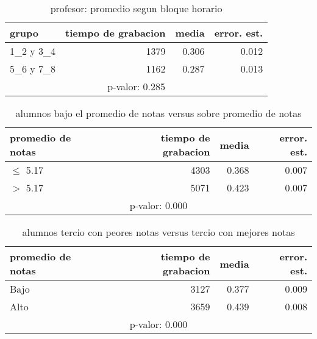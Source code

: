 \documentclass[spanish]{article}
\begin{document}
\begin{table}[h!]
\begin{center}
\begin{tabular}{|l|r|r|r|}
\hline
grupo     & tiempo de grabacion & media          & error. est.    \\ \hline
1\_2 y 3\_4 &                1379 &          0.306 &           0.012\\ \hline
5\_6 y 7\_8 &                1162 &          0.287 &           0.013\\ \hline
\multicolumn{4}{|c|}{p-valor: 0.285} \\ \hline
\end{tabular}
\caption{profesor: promedio segun bloque horario}
\end{center}
\end{table}

\begin{table}[h!]
\begin{center}
\begin{tabular}{|l|r|r|r|}
\hline
promedio de notas & tiempo de grabacion & media          & error. est.     \\ \hline
$\leq$ 5.17           &                4303 &          0.368 &            0.007\\ \hline
$>$ 5.17            &                5071 &          0.423 &            0.007\\ \hline
\multicolumn{4}{|c|}{p-valor: 0.000} \\ \hline
\end{tabular}
\caption{alumnos bajo el promedio de notas versus sobre promedio de notas}
\end{center}
\end{table}

\begin{table}[h!]
\begin{center}
\begin{tabular}{|l|r|r|r|}
\hline
promedio de notas & tiempo de grabacion & media          & error. est.     \\ \hline
Bajo              &                3127 &          0.377 &            0.009\\ \hline
Alto              &                3659 &          0.439 &            0.008\\ \hline
\multicolumn{4}{|c|}{p-valor: 0.000} \\ \hline
\end{tabular}
\caption{alumnos tercio con peores notas versus tercio con mejores notas}
\end{center}
\end{table}
\end{document}
